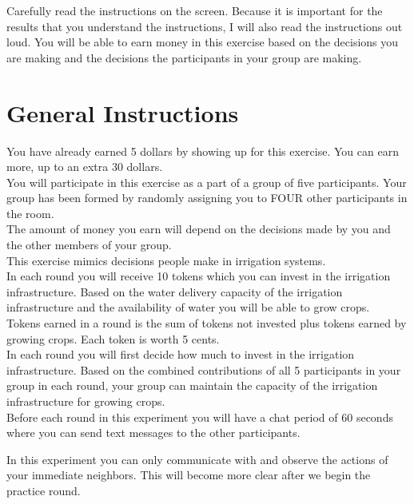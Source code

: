 \documentclass[11pt]{article}
\begin{document}
Carefully read the instructions on the screen. Because it is important
for the results that you understand the instructions, I will also read
the instructions out loud.  You will be able to earn money in this
exercise based on the decisions you are making and the decisions the
participants in your group are making.

\newpage

\section{General Instructions} 


You have already earned 5 dollars by showing up for this exercise. You
can earn more, up to an extra 30 dollars. \\

You will participate in this exercise as a part of a group of five
participants. Your group has been formed by randomly assigning you to
FOUR other participants in
the room.\\

The amount of money you earn will depend on the decisions made by you
and the other members of your group.\\

This exercise mimics decisions people make in irrigation systems. \\

In each round you will receive 10 tokens which you can invest in the
irrigation infrastructure. Based on the water delivery capacity of the
irrigation infrastructure and the availability of water you will be able to grow crops. \\

Tokens earned in a round is the sum of tokens not invested plus tokens
earned by growing crops. Each token is worth 5 cents. \\

In each round you will first decide how much to invest in the
irrigation infrastructure.  Based on the combined contributions of all
5 participants in your group in each round, your group can maintain
the capacity of the irrigation infrastructure for growing crops.  \\


Before each round in this experiment you will have a chat period of 60
seconds where you can send text messages to the other participants.  

In this experiment you can only communicate with and observe the actions of your
immediate neighbors.  This will become more clear after we begin the practice round.
\end{document}
